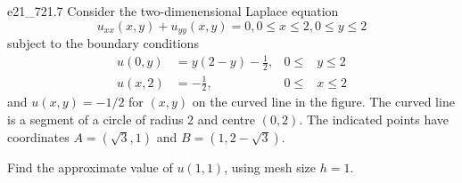 \begin{problemwithimage}{e21_7}{21.7}
  Consider the two-dimenensional Laplace equation
  \begin{equation*}
    u_{x x}(x,y) + u_{yy}(x,y) = 0, 0\leq x\leq 2, 0 \leq y\leq 2
  \end{equation*}
  subject to the boundary conditions
  \begin{align*}
    u(0,y) &= y(2-y) - \frac{1}{2}, & 0 \leq &y \leq 2 \\
    u(x,2) &= - \frac{1}{2}, & 0 \leq &x \leq 2
  \end{align*}
  and $u(x,y) = - 1 / 2$ for $(x,y)$ on the curved line in the figure.
  The curved line is a segment of a circle of radius 2 and centre $(0,2)$.
  The indicated points have coordinates $A = (\sqrt{3}, 1)$ and $B = (1, 2 - \sqrt{3})$.
  
  Find the approximate value of $u(1,1)$, using mesh size $h = 1$.
\end{problemwithimage}
